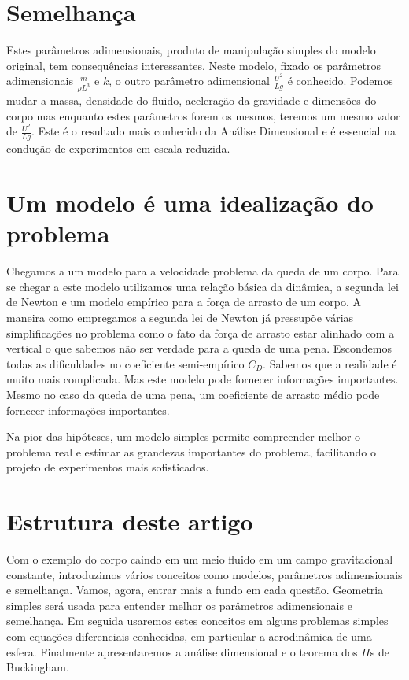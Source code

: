 \section{Semelhança}
Estes parâmetros adimensionais, produto de manipulação simples do modelo original, tem consequências interessantes. Neste modelo, fixado os parâmetros adimensionais $\frac{m}{\rho L^3}$ e $k$, o outro parâmetro adimensional $\frac{U^2}{Lg}$ é conhecido. Podemos mudar a massa, densidade do fluido, aceleração da gravidade e dimensões do corpo mas enquanto estes parâmetros forem os mesmos, teremos um mesmo valor de $\frac{U^2}{Lg}$. Este é o resultado mais conhecido da Análise Dimensional e é essencial na condução de experimentos em escala reduzida.

\section{Um modelo é uma idealização do problema}
Chegamos a um modelo para a velocidade  problema da queda de um corpo. Para se chegar a este modelo utilizamos uma relação básica da dinâmica, a segunda lei de Newton e um modelo empírico para a força de arrasto de um corpo. A maneira como empregamos a segunda lei de Newton já pressupõe várias simplificações no problema como o fato da força de arrasto estar alinhado com a vertical o que sabemos não ser verdade para a queda de uma pena. Escondemos todas as dificuldades no coeficiente semi-empírico $C_D$. Sabemos que a realidade é muito mais complicada. Mas este modelo pode fornecer informações importantes. Mesmo no caso da queda de uma pena, um coeficiente de arrasto médio pode fornecer informações importantes.

Na pior das hipóteses, um modelo simples permite compreender melhor o problema real e estimar as grandezas importantes do problema, facilitando o projeto de experimentos mais sofisticados.

\section{Estrutura deste artigo}

Com o exemplo do corpo caindo em um meio fluido em um campo gravitacional constante, introduzimos vários conceitos como modelos, parâmetros adimensionais e semelhança. Vamos, agora, entrar mais a fundo em cada questão. Geometria simples será usada para entender melhor os parâmetros adimensionais e semelhança. Em seguida usaremos estes conceitos em alguns problemas simples com equações diferenciais conhecidas, em particular a aerodinâmica de uma esfera. Finalmente apresentaremos a análise dimensional e o teorema dos $\Pi$s de Buckingham.

